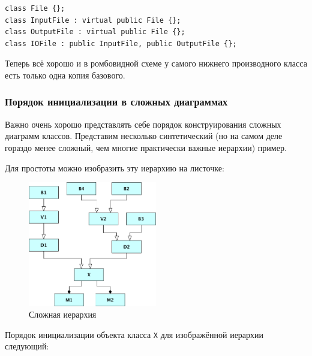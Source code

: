 \documentclass[a4paper,12pt,oneside]{article}
\begin{document}
\begin{lstlisting}
class File {};
class InputFile : virtual public File {};
class OutputFile : virtual public File {};
class IOFile : public InputFile, public OutputFile {};
\end{lstlisting}

Теперь всё хорошо и в ромбовидной схеме у самого нижнего производного класса есть только одна копия базового.

\subsubsection{Порядок инициализации в сложных диаграммах}

Важно очень хорошо представлять себе порядок конструирования сложных диаграмм классов. Представим несколько синтетический (но на самом деле гораздо менее сложный, чем многие практически важные иерархии) пример.



Для простоты можно изобразить эту иерархию на листочке:

\begin{figure}[h!]
\centering
\includegraphics[width=0.5\textwidth]{illustrations/complexhier-crop.pdf}
\caption{Сложная иерархия}
\label{fig:complexhier-crop}
\end{figure}

Порядок инициализации объекта класса \lstinline!X! для изображённой иерархии следующий:
\end{document}
